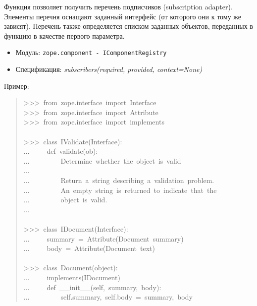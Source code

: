 \documentclass[14pt,a4paper,openany,twoside,final]{extbook}
\providecommand*{\DUroletitlereference}[1]{\textsl{#1}}
\begin{document}
Функция позволяет получить перечень подписчиков (subscription
adapter).  Элементы перечня оснащают заданный интерфейс (от которого
они к тому же зависят).  Перечень также определяется списком заданных
объектов, переданных в функцию в качестве первого параметра.

\begin{itemize}

\item Модуль: \texttt{zope.component - IComponentRegistry}

\item Спецификация: \DUroletitlereference{subscribers(required, provided, context=None)}

\end{itemize}

Пример:

\begin{quote}{\ttfamily \raggedright \noindent
>{}>{}>~from~zope.interface~import~Interface\\
>{}>{}>~from~zope.interface~import~Attribute\\
>{}>{}>~from~zope.interface~import~implements\\
~\\
>{}>{}>~class~IValidate(Interface):\\
...~~~~~def~validate(ob):\\
...~~~~~~~~~\textquotedbl{}\textquotedbl{}\textquotedbl{}Determine~whether~the~object~is~valid\\
...\\
...~~~~~~~~~Return~a~string~describing~a~validation~problem.\\
...~~~~~~~~~An~empty~string~is~returned~to~indicate~that~the\\
...~~~~~~~~~object~is~valid.\\
...~~~~~~~~~\textquotedbl{}\textquotedbl{}\textquotedbl{}\\
~\\
>{}>{}>~class~IDocument(Interface):\\
...~~~~~summary~=~Attribute(\textquotedbl{}Document~summary\textquotedbl{})\\
...~~~~~body~=~Attribute(\textquotedbl{}Document~text\textquotedbl{})\\
~\\
>{}>{}>~class~Document(object):\\
...~~~~~implements(IDocument)\\
...~~~~~def~\_\_init\_\_(self,~summary,~body):\\
...~~~~~~~~~self.summary,~self.body~=~summary,~body\\
}
\end{quote}
\end{document}
